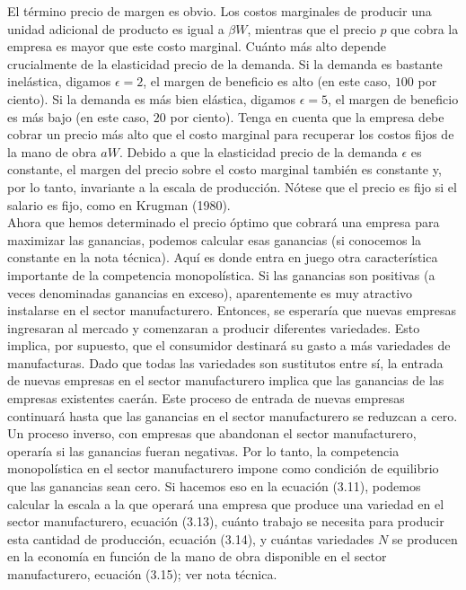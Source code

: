 El término precio de margen es obvio. Los costos marginales de producir una unidad adicional de producto es igual a $\beta W$, mientras que el precio $p$ que cobra la empresa es mayor que este costo marginal. Cuánto más alto depende crucialmente de la elasticidad precio de la demanda. Si la demanda es bastante inelástica, digamos $\epsilon = 2$, el margen de beneficio es alto (en este caso, $100$ por ciento). Si la demanda es más bien elástica, digamos $\epsilon = 5$, el margen de beneficio es más bajo (en este caso, $20$ por ciento). Tenga en cuenta que la empresa debe cobrar un precio más alto que el costo marginal para recuperar los costos fijos de la mano de obra $a W$. Debido a que la elasticidad precio de la demanda $\epsilon$ es constante, el margen del precio sobre el costo marginal también es constante y, por lo tanto, invariante a la escala de producción. Nótese que el precio es fijo si el salario es fijo, como en Krugman (1980).\\
Ahora que hemos determinado el precio óptimo que cobrará una empresa para maximizar las ganancias, podemos calcular esas ganancias (si conocemos la constante en la nota técnica). Aquí es donde entra en juego otra característica importante de la competencia monopolística. Si las ganancias son positivas (a veces denominadas ganancias en exceso), aparentemente es muy atractivo instalarse en el sector manufacturero. Entonces, se esperaría que nuevas empresas ingresaran al mercado y comenzaran a producir diferentes variedades. Esto implica, por supuesto, que el consumidor destinará su gasto a más variedades de manufacturas. Dado que todas las variedades son sustitutos entre sí, la entrada de nuevas empresas en el sector manufacturero implica que las ganancias de las empresas existentes caerán. Este proceso de entrada de nuevas empresas continuará hasta que las ganancias en el sector manufacturero se reduzcan a cero. Un proceso inverso, con empresas que abandonan el sector manufacturero, operaría si las ganancias fueran negativas. Por lo tanto, la competencia monopolística en el sector manufacturero impone como condición de equilibrio que las ganancias sean cero. Si hacemos eso en la ecuación (3.11), podemos calcular la escala a la que operará una empresa que produce una variedad en el sector manufacturero, ecuación (3.13), cuánto trabajo se necesita para producir esta cantidad de producción, ecuación (3.14), y cuántas variedades $N$ se producen en la economía en función de la mano de obra disponible en el sector manufacturero, ecuación (3.15); ver nota técnica.

